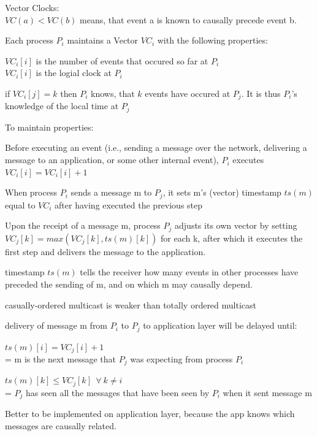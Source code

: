 \documentclass[ngerman,a4paper]{report}
\begin{document}
\begin{compactitem}
	\item Vector Clocks: \\
		$VC(a) < VC(b)$ means, that event a is known to causally precede event b.
	\item Each process $P_i$ maintains a Vector $VC_i$ with the following properties:
		\begin{compactenum}
			\item $VC_i[i]$ is the number of events that occured so far at $P_i$ \\
				$VC_i[i]$ is the logial clock at $P_i$
			\item if $VC_i[j]=k$ then $P_i$ knows, that $k$ events have occured at $P_j$. It is thus $P_i$'s knowledge of the local time at $P_j$
		\end{compactenum}		
 	\item To maintain properties:
 			\begin{compactenum}
 			\item Before executing an event (i.e., sending a message over the network, delivering a message to an application, or some other internal event), $P_i$ executes $VC_i[i] = VC_i[i] + 1$
 			\item When process $P_i$ sends a message m to $P_j$, it sets m's (vector) timestamp $ts(m)$ equal to $VC_i$ after having executed the previous step
 			\item Upon the receipt of a message m, process $P_j$ adjusts its own vector by setting $VC_j[k] = max(VC_j[k], ts(m)[k])$ for each k, after which it executes the first step and delivers the message to the application. 			
		\end{compactenum}
		\item timestamp $ts (m)$ tells the receiver how many events in other processes have preceded the sending of m, and on which m may causally depend.
		\item casually-ordered multicast is weaker than totally ordered multicast
		\item delivery of message m from $P_i$ to $P_j$ to application layer will be delayed until:
 		\begin{compactenum}
 			\item $ts(m)[i] = VC_j[i]+1$ \\
 			= m is the next message that $P_j$ was expecting from process $P_i$

 			\item $ts(m)[k] \leq VC_j[k] \ \ \forall \ k \neq i$ \\
 			= $P_j$ has seen all the messages that have been seen by $P_i$ when it sent message m

		\end{compactenum}
		\item Better to be implemented on application layer, because the app knows which messages are causally related.

 	
\end{compactitem}
\end{document}
